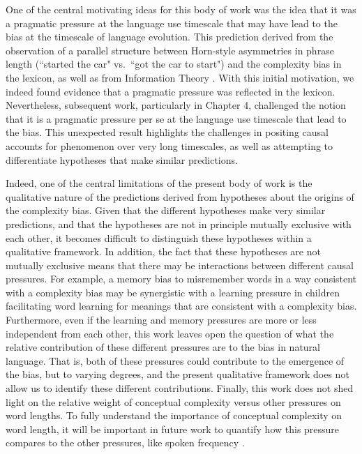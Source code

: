 One of the central motivating ideas for this body of work was the idea that it was a pragmatic pressure at the language use timescale that may have lead to the bias at the timescale of language evolution. This prediction derived from the observation of a parallel structure between Horn-style asymmetries in phrase length (``started the car" vs.\ ``got the car to start") and the complexity bias in the lexicon, as well as from Information Theory \cite{horn1984,shannon1948}. With this initial motivation, we indeed found evidence that a pragmatic pressure was reflected in the lexicon. Nevertheless, subsequent work, particularly in Chapter 4, challenged the notion that it is a pragmatic pressure  per se at the language use timescale that lead to the bias. This unexpected result highlights the challenges in positing causal accounts for phenomenon over very long timescales, as well as attempting to differentiate hypotheses that make  similar predictions.

Indeed, one of the central limitations of the present body of work is the qualitative nature of the predictions derived from  hypotheses about the origins of the complexity bias. Given that the different hypotheses make very similar predictions, and that the hypotheses are not in principle mutually exclusive with each other, it becomes difficult to distinguish these hypotheses within a qualitative framework. In addition, the fact that these hypotheses are not mutually exclusive means that there may be interactions between different causal pressures. For example, a memory bias to misremember words in a way consistent with a complexity bias may be synergistic with a learning pressure in children facilitating word learning for meanings that are consistent with a complexity bias. Furthermore, even if the learning and memory pressures are more or less independent from each other, this work leaves open the question of what the relative contribution of these different pressures are to the bias in natural language. That is, both of these pressures could contribute to the emergence of the bias, but to varying degrees, and the present qualitative framework does not allow us to identify these different contributions. Finally, this work does not shed light on the relative weight of conceptual complexity versus other pressures on word lengths. To fully understand the importance of conceptual complexity on word length, it will be important in future work to quantify how this pressure compares to the other pressures, like spoken frequency \cite{zipf1936}.

